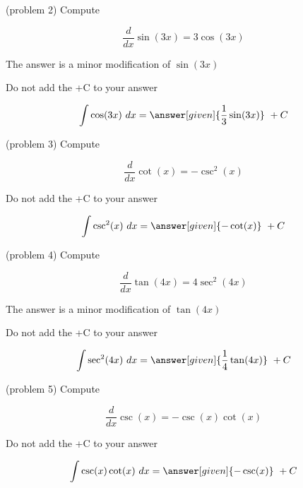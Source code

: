 \documentclass{ximera}
\begin{document}
\begin{problem}(problem 2)
Compute
\begin{hint}
\[
\frac{d}{dx} \sin(3x) = 3\cos(3x)
\]
\end{hint}
\begin{hint}
The answer is a minor modification of $\sin(3x)$
\end{hint}
\begin{hint}
\begin{center}
Do not add the +C to your answer
\end{center}
\end{hint}

\[
\int \cos(3x) \ dx =
\answer[given]{\frac13 \sin(3x)} \ + C
\]
\end{problem}



\begin{problem}(problem 3)
Compute 

\begin{hint}
\[
\frac{d}{dx} \cot(x) = -\csc^2(x)
\]
\end{hint}
\begin{hint}
\begin{center}
Do not add the +C to your answer
\end{center}
\end{hint}

\[
\int \csc^2(x) \ dx =
\answer[given]{-\cot(x)} \ + C
\]
\end{problem}

\begin{problem}(problem 4)
Compute 

\begin{hint}
\[
\frac{d}{dx} \tan(4x) = 4\sec^2(4x)
\]
\end{hint}
\begin{hint}
The answer is a minor modification of $\tan(4x)$
\end{hint}
\begin{hint}
\begin{center}
Do not add the +C to your answer
\end{center}
\end{hint}

\[
\int \sec^2(4x) \ dx =
\answer[given]{\frac14\tan(4x)} \ + C
\]
\end{problem}




\begin{problem}(problem 5)
Compute 

\begin{hint}
\[
\frac{d}{dx} \csc(x) = -\csc(x)\cot(x)
\]
\end{hint}
\begin{hint}
\begin{center}
Do not add the +C to your answer
\end{center}
\end{hint}

\[
\int \csc(x)\cot(x) \ dx =
\answer[given]{-\csc(x)} \ + C
\]
\end{problem}
\end{document}
